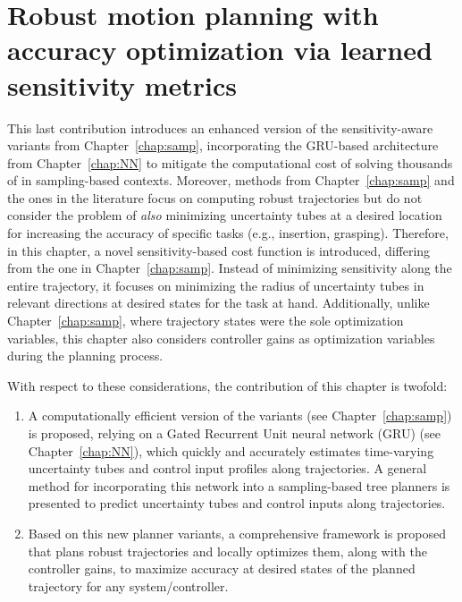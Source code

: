 \chapter{Robust motion planning with accuracy optimization via learned sensitivity metrics}\label{chap:sampNN}
\localtableofcontents \newpage

This last contribution introduces an enhanced version of the sensitivity-aware variants from Chapter~\ref{chap:samp}, incorporating the GRU-based architecture from Chapter~\ref{chap:NN} to mitigate the computational cost of solving thousands of  in sampling-based contexts. 
Moreover, methods from Chapter~\ref{chap:samp} and the ones in the literature focus on computing robust trajectories but do not consider the problem of \emph{also} minimizing uncertainty tubes at a desired location for increasing the accuracy of specific tasks (e.g., insertion, grasping).
Therefore, in this chapter, a novel sensitivity-based cost function is introduced, differing from the one in Chapter~\ref{chap:samp}. 
Instead of minimizing sensitivity along the entire trajectory, it focuses on minimizing the radius of uncertainty tubes in relevant directions at desired states for the task at hand. 
Additionally, unlike Chapter~\ref{chap:samp}, where trajectory states were the sole optimization variables, this chapter also considers controller gains as optimization variables during the planning process.

With respect to these considerations, the contribution of this chapter is twofold:
\begin{enumerate}
    \item A computationally efficient version of the  variants (see Chapter~\ref{chap:samp}) is proposed, relying on a Gated Recurrent Unit neural network (GRU)\cite{cGRU} (see Chapter~\ref{chap:NN}), which quickly and accurately estimates time-varying uncertainty tubes and control input profiles along trajectories.
    A general method for incorporating this network into a sampling-based tree planners is presented to predict uncertainty tubes and control inputs along trajectories.
    \item Based on this new planner variants, a comprehensive framework is proposed that plans robust trajectories and locally optimizes them, along with the controller gains, to maximize accuracy at desired states of the planned trajectory for any system/controller.
\end{enumerate}

